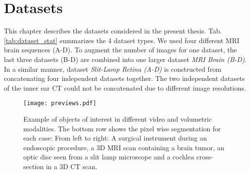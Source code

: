 \chapter{Datasets}
\label{datasets}

This chapter describes the datasets considered in the present thesis.
Tab. \ref{tab:dataset_stat} summarizes the 4 dataset types.
We used four different MRI brain sequences (A-D).
To augment the number of images for one dataset, the last three datasets (B-D) are combined into one larger dataset \textit{MRI Brain (B-D)}.
In a similar manner, dataset \textit{Slit-Lamp Retina (A-D)} is constructed from concatenating four independent datasets together.
The two independent datasets of the inner ear CT could not be concatenated due to different image resolutions.



\begin{figure}
\centering
\texttt{[image: previews.pdf]}
\caption{Example of objects of interest in different video and volumetric modalities. The bottom row shows the pixel wise segmentation for each case: From left to right: A surgical instrument during an endoscopic procedure, a 3D MRI scan containing a brain tumor, an optic disc seen from a slit lamp microscope and a cochlea cross-section in a 3D CT scan.}
\label{fig:dset_previews}
\end{figure}

